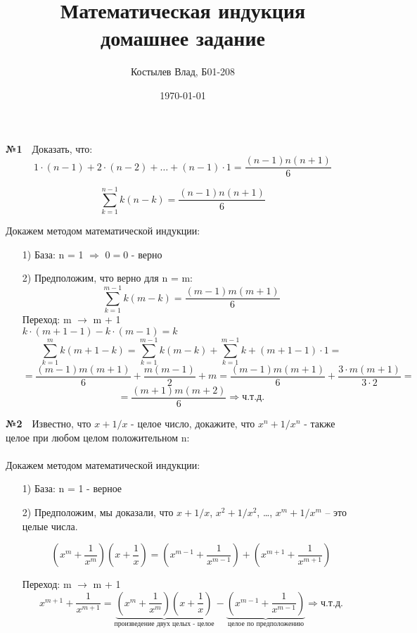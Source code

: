 \documentclass[a4paper, 12pt]{article}
\author{Костылев Влад, Б01-208}
\date{\today}
\title{\textbf{Математическая индукция} \\ 
домашнее задание}
\begin{document}
	\maketitle
	
	\textbf{№1}\
	\
	Доказать, что:
	\[
	1 \cdot (n - 1) + 2 \cdot (n - 2) + \dots + (n - 1) \cdot 1 = \frac{(n - 1)n(n + 1)} {6} 
	\]
	
	\[
	\sum_{k = 1}^{n - 1} k(n - k) = \frac{(n - 1)n(n + 1)} {6}
	\]
	
	Докажем методом математической индукции:\
	\begin{enumerate}
		\item[1)] База: n = 1 $\Rightarrow$ $0 = 0$ - верно
		\item[2)] Предположим, что верно для n = m: \\
		\[
			\sum_{k = 1}^{m - 1} k(m - k) = \frac{(m - 1)m(m + 1)} {6}
		\]
		Переход: m $\rightarrow$ m + 1 \\
		$k\cdot(m + 1 - 1) - k\cdot(m - 1) = k$
		\[
			\sum_{k = 1}^{m} k(m + 1 - k) = \sum_{k = 1}^{m - 1} k(m - k) + \sum_{k = 1}^{m - 1} k + (m + 1 - 1) \cdot 1 = 
		\]
		\[
			= \frac{(m - 1)m(m + 1)} {6} + \frac{m(m - 1)}{2} + m = \frac{(m - 1)m(m + 1)} {6} + \frac{3 \cdot m(m + 1)} {3 \cdot 2} = 
		\]
		\[
			= \frac{(m+1)m(m + 2)} {6} \Rightarrow ч.т.д.
		\]
	\end{enumerate}

	\textbf{№2}\ 
	\	
	Известно, что $x + 1/x$ - целое число, докажите, что $x^n + 1/x^n$ - также целое при любом целом положительном n:\\
	\\
	Докажем методом математической индукции:\
	\begin{enumerate}
		\item[1)] База: n = 1 - верное
		\item[2)] Предположим, мы доказали, что $x + 1/x$, $x^2 + 1/x^2$, \dots, $x^m + 1/x^m$ -- это целые числа.
		
		\[
			(x^m + \frac{1}{x^m})(x + \frac{1}{x}) = (x^{m - 1} + \frac{1}{x^{m - 1}}) + (x^{m + 1} + \frac{1}{x^{m + 1}})	
		\]
	
		Переход: m $\rightarrow$ m + 1\\
		\[
			x^{m + 1} + \frac{1}{x^{m + 1}} = \underbrace{(x^m + \frac{1}{x^m})(x + \frac{1}{x})}_{\text{произведение двух целых - целое}} - \underbrace{(x^{m - 1} + \frac{1}{x^{m - 1}})}_{\text{целое по предположению}} \Rightarrow ч.т.д.	
		\]
				 
	\end{enumerate}
	
\end{document}
